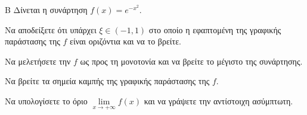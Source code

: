 \begin{thema}{Β}
Δίνεται η συνάρτηση $f(x) = e^{-x^2}$.
\begin{erwthma}
\item Να αποδείξετε ότι υπάρχει $\xi \in (-1, 1)$ στο οποίο η εφαπτομένη της γραφικής παράστασης της $f$ είναι οριζόντια και να το βρείτε.
\item Να μελετήσετε την $f$ ως προς τη μονοτονία και να βρείτε το μέγιστο της συνάρτησης.
\item Να βρείτε τα σημεία καμπής της γραφικής παράστασης της $f$.
\item Να υπολογίσετε το όριο $\lim\limits_{x \to +\infty} f(x)$ και να γράψετε την αντίστοιχη ασύμπτωτη.
\end{erwthma}
\end{thema}

